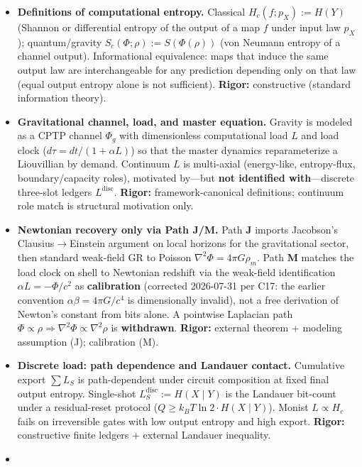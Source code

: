 \documentclass[
  11pt,
]{article}
\begin{document}
\begin{itemize}
\item
  \textbf{Definitions of computational entropy.} Classical
  \(H_c(f;p_X):=H(Y)\) (Shannon or differential entropy of the output of
  a map \(f\) under input law \(p_X\)); quantum/gravity
  \(S_c(\Phi;\rho):=S(\Phi(\rho))\) (von Neumann entropy of a channel
  output). Informational equivalence: maps that induce the same output law are interchangeable for any prediction depending only on that law (equal output entropy alone is not sufficient). \textbf{Rigor:} constructive (standard information
  theory).
\item
  \textbf{Gravitational channel, load, and master equation.} Gravity is
  modeled as a CPTP channel \(\Phi_g\) with dimensionless computational
  load \(L\) and load clock ($d\tau=dt/(1+\alpha L)$) so that
  the master dynamics reparameterize a Liouvillian by demand. Continuum
  \(L\) is multi-axial (energy-like, entropy-flux, boundary/capacity
  roles), motivated by---but \textbf{not identified with}---discrete
  three-slot ledgers \(L^{\mathrm{disc}}\). \textbf{Rigor:}
  framework-canonical definitions; continuum role match is structural
  motivation only.
\item
  \textbf{Newtonian recovery only via Path J/M.} Path \textbf{J} imports
  Jacobson's Clausius$\to$Einstein argument on local horizons for the
  gravitational sector, then standard weak-field GR to Poisson
  \(\nabla^2\Phi=4\pi G\rho_m\). Path \textbf{M} matches the load clock
  on shell to Newtonian redshift via the weak-field identification
  \(\alpha L=-\Phi/c^2\) as \textbf{calibration} (corrected 2026-07-31 per C17:
  the earlier convention \(\alpha\beta=4\pi G/c^4\) is dimensionally invalid), not
  a free derivation of Newton's constant from bits alone. A pointwise
  Laplacian path
  \(\Phi\propto\rho\Rightarrow\nabla^2\Phi\propto\nabla^2\rho\) is
  \textbf{withdrawn}. \textbf{Rigor:} external theorem + modeling
  assumption (J); calibration (M).
\item
  \textbf{Discrete load: path dependence and Landauer contact.}
  Cumulative export \(\sum L_S\) is path-dependent under circuit
  composition at fixed final output entropy. Single-shot
  \(L_S^{\mathrm{disc}}:=H(X\mid Y)\) is the Landauer bit-count under a
  residual-reset protocol (\(Q\ge k_B T\ln 2\cdot H(X\mid Y)\)). Monist
  \(L\propto H_c\) fails on irreversible gates with low output entropy
  and high export. \textbf{Rigor:} constructive finite ledgers +
  external Landauer inequality.
\item

\end{itemize}
\end{document}
